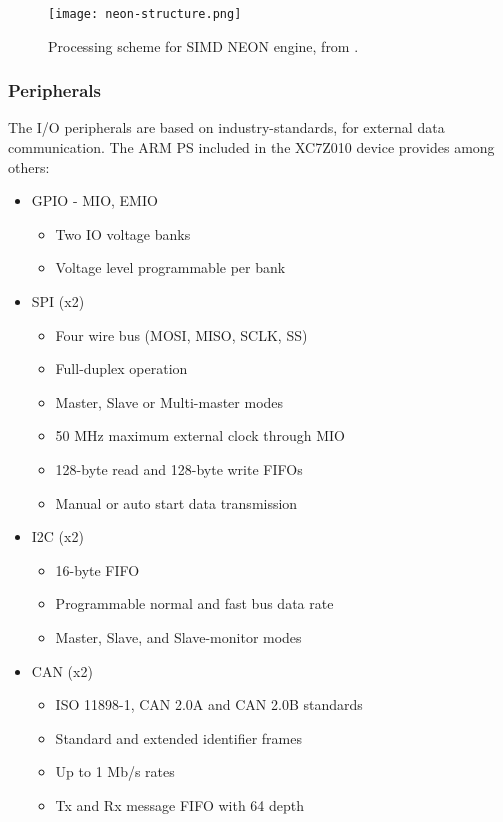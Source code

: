 \begin{figure}[htp]
	\centering
	\texttt{[image: neon-structure.png]}
	\caption{Processing scheme for SIMD NEON engine, from \cite{Crokett2014}.}
	\label{fig:neon-structure}
\end{figure}

\subsubsection{Peripherals}

The I/O peripherals are based on industry-standards, for external data communication. The ARM PS
included in the XC7Z010 device provides among others:

\begin{itemize}
	\item GPIO - MIO, EMIO
	\begin{itemize}
		\item Two IO voltage banks
		\item Voltage level programmable per bank
	\end{itemize}
	\item SPI (x2)
	\begin{itemize}
		\item Four wire bus (MOSI, MISO, SCLK, SS)
		\item Full-duplex operation
		\item Master, Slave or Multi-master modes
		\item 50 MHz maximum external clock through MIO
		\item 128-byte read and 128-byte write FIFOs
		\item Manual or auto start data transmission
	\end{itemize}
	\item I2C (x2)
	\begin{itemize}
		\item 16-byte FIFO
		\item Programmable normal and fast bus data rate
		\item Master, Slave, and Slave-monitor modes
	\end{itemize}
	\item CAN (x2)
	\begin{itemize}
		\item ISO 11898-1, CAN 2.0A and CAN 2.0B standards
		\item Standard and extended identifier frames
		\item Up to 1 Mb/s rates
		\item Tx and Rx message FIFO with 64 depth

\end{itemize}
\end{itemize}
